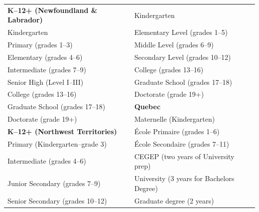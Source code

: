 \documentclass[
]{book}
\theoremstyle{definition}
\theoremstyle{definition}
\theoremstyle{definition}
\theoremstyle{definition}
\theoremstyle{remark}
\begin{document}
\begin{table}
\begin{tabular}[t]{>{}l|l}
\textbf{K–12+ (Newfoundland \& Labrador)} & \hspace{1em}Kindergarten\\
\hspace{1em}Kindergarten & \hspace{1em}Elementary Level (grades 1–5)\\
\hspace{1em}Primary (grades 1–3) & \hspace{1em}Middle Level (grades 6–9)\\
\hspace{1em}Elementary (grades 4–6) & \hspace{1em}Secondary Level (grades 10–12)\\
\hspace{1em}Intermediate (grades 7–9) & \hspace{1em}College (grades 13–16)\\
\hspace{1em}Senior High (Level I–III) & \hspace{1em}Graduate School (grades 17–18)\\
\hspace{1em}College (grades 13–16) & \hspace{1em}Doctorate (grade 19+)\\
\hspace{1em}Graduate School (grades 17–18) & \textbf{Quebec}\\
\hspace{1em}Doctorate (grade 19+) & \hspace{1em}Maternelle (Kindergarten)\\
\textbf{K–12+ (Northwest Territories)} & \hspace{1em}École Primaire (grades 1–6)\\
\hspace{1em}Primary (Kindergarten–grade 3) & \hspace{1em}École Secondaire (grades 7–11)\\
\hspace{1em}Intermediate (grades 4–6) & \hspace{1em}CEGEP (two years of University prep)\\
\hspace{1em}Junior Secondary (grades 7–9) & \hspace{1em}University (3 years for Bachelors Degree)\\
\hspace{1em}Senior Secondary (grades 10–12) & \hspace{1em}Graduate degree (2 years)\\

\end{tabular}
\end{table}
\end{document}
